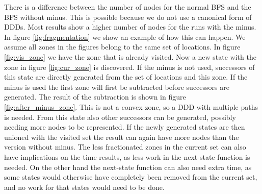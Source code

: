 There is a difference between the number of nodes for the normal BFS and the BFS without minus. This is possible because we do not use a canonical form of DDDs. Most results show a higher number of nodes for the runs with the minus. In figure \ref{fig:fragmentation} we show an example of how this can happen. We assume all zones in the figures belong to the same set of locations. In figure \ref{fig:vis_zone} we have the zone that is already visited. Now a new state with the zone in figure \ref{fig:cur_zone} is discovered. If the minus is not used, successors of this state are directly generated from the set of locations and this zone. If the minus is used the first zone will first be subtracted before successors are generated. The result of the subtraction is shown in figure \ref{fig:after_minus_zone}. This is not a convex zone, so a DDD with multiple paths is needed. From this state also other successors can be generated, possibly needing more nodes to be represented. If the newly generated states are then unioned with the visited set the result can again have more nodes than the version without minus. The less fractionated zones in the current set can also have implications on the time results, as less work in the next-state function is needed. On the other hand the next-state function can also need extra time, as some states would otherwise have completely been removed from the current set, and no work for that states would need to be done. 

